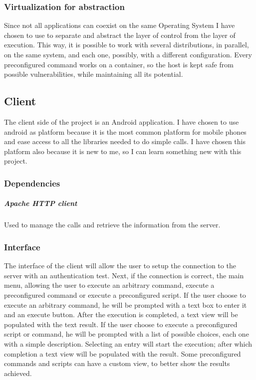 \documentclass[../PiTest.tex]{subfiles}
\begin{document}
    \subsubsection{Virtualization for abstraction}
    Since not all applications can coexist on the same Operating System I have chosen to use \docker to separate and abstract the layer of control from the layer of execution. This way, it is possible to work with several distributions, in parallel, on the same system, and each one, possibly, with a different configuration.
    Every preconfigured command works on a \docker container, so the host is kept safe from possible vulnerabilities, while maintaining all its potential.

    \subsection{Client}
    The client side of the project is an Android application. I have chosen to use android as platform because it is the most common platform for mobile phones and ease access to all the libraries needed to do simple \REST calls. I have chosen this platform also because it is new to me, so I can learn something new with this project.

    \subsubsection{Dependencies}
    \subparagraph{Apache HTTP client}
    Used to manage the \REST calls and retrieve the information from the server.

    \subsubsection{Interface}
    The interface of the client will allow the user to setup the connection to the server with an authentication test. Next, if the connection is correct, the main menu, allowing the user to execute an arbitrary command, execute a preconfigured command or execute a preconfigured script.
    If the user choose to execute an arbitrary command, he will be prompted with a text box to enter it and an execute button. After the execution is completed, a text view will be populated with the text result.
    If the user choose to execute a preconfigured script or command, he will be prompted with a list of possible choices, each one with a simple description.
    Selecting an entry will start the execution; after which completion a text view will be populated with the result. Some preconfigured commands and scripts can have a custom view, to better show the results achieved.
\end{document}
